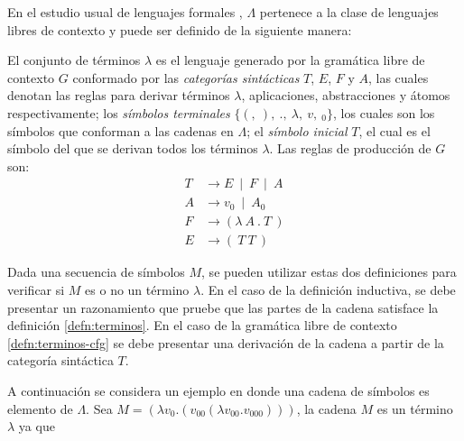 En el estudio usual de lenguajes formales \cite{Hopcroft:Automata}, \( Λ \) pertenece a la clase de lenguajes libres de contexto y puede ser definido de la siguiente manera:

\begin{defn}[Términos \( λ \)]
  \label{defn:terminos-cfg}
  El conjunto de términos \( λ \) es el lenguaje generado por la gramática libre de contexto \( G \) conformado por las \emph{categorías sintácticas} \( T \), \( E \), \( F \) y \( A \), las cuales denotan las reglas para derivar términos \( λ \), aplicaciones, abstracciones y átomos respectivamente; los \emph{símbolos terminales} \( \{(,\ ),\ .,\ λ,\ v,\ {}_{0}\} \), los cuales son los símbolos que conforman a las cadenas en \( Λ \); el \emph{símbolo inicial} \( T \), el cual es el símbolo del que se derivan todos los términos \( λ \). Las reglas de producción de \( G \) son:
  \begin{subequations}
  \begin{align}
    \label{terminos-cfg:terminos}
    T & \rightarrow E\ \mid\ F\ \mid\ A \\
    \label{terminos-cfg:atomos}
    A & \rightarrow v_{0}\ \mid\ A {}_{0} \\
    \label{terminos-cfg:abstracciones}
    F & \rightarrow ( λ\ A\ .\ T\ ) \\
    \label{terminos-cfg:aplicaciones}
    E & \rightarrow (\ T\ T\ )
    \end{align}
  \end{subequations}
\end{defn}

Dada una secuencia de símbolos \( M \), se pueden utilizar estas dos definiciones para verificar si \( M \) es o no un término \( λ \). En el caso de la definición inductiva, se debe presentar un razonamiento que pruebe que las partes de la cadena satisface la definición \ref{defn:terminos}. En el caso de la gramática libre de contexto \ref{defn:terminos-cfg} se debe presentar una derivación de la cadena a partir de la categoría sintáctica \( T \).

A continuación se considera un ejemplo en donde una cadena de símbolos es elemento de \( Λ \). Sea \( M = (λv_{0}.(v_{00} (λv_{00}.v_{000}))) \), la cadena \( M \) es un término \( λ \) ya que

